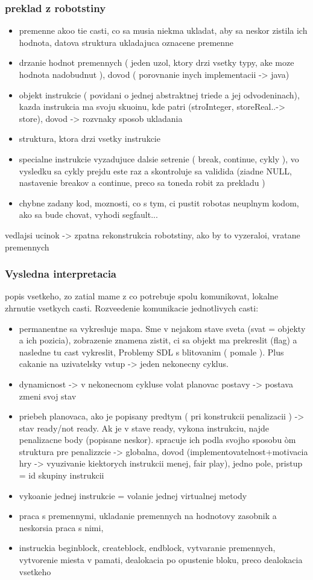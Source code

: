 \documentclass[12pt,notitlepage]{report}
\begin{document}
\subsubsection{preklad z robotstiny}
\begin{itemize}
\item premenne akoo tie casti, co sa musia niekma ukladat, aby sa neskor zistila ich hodnota, datova struktura ukladajuca oznacene premenne
\item drzanie hodnot premennych ( jeden uzol, ktory drzi vsetky typy, ake moze hodnota nadobudnut ), dovod ( porovnanie inych implementacii -> java)
\item objekt instrukcie ( povidani o jednej abstraktnej triede a jej odvodeninach), kazda instrukcia ma svoju skuoinu, kde patri (stroInteger, storeReal..-> store), dovod -> rozvnaky sposob ukladania
\item struktura, ktora drzi vsetky instrukcie
\item specialne instrukcie vyzadujuce dalsie setrenie ( break, continue, cykly ), vo vysledku sa cykly prejdu este raz a skontroluje sa validida (ziadne NULL, nastavenie breakov a continue, preco sa toneda robit za prekladu )
\item chybne zadany kod, moznosti, co s tym, ci pustit robotas  neuplnym kodom, ako sa bude chovat, vyhodi segfault...
\end{itemize}
vedlajsi ucinok -> zpatna rekonstrukcia robotstiny, ako by to vyzeraloi, vratane premennych
\subsubsection{Vysledna interpretacia}
popis vsetkeho, zo zatial mame z co potrebuje spolu komunikovat, lokalne zhrnutie vsetkych casti. Rozveedenie komunikacie jednotlivych casti:
\begin{itemize}
\item permanentne sa vykresluje mapa. Sme v nejakom stave sveta (svat = objekty a ich pozicia), zobrazenie znamena zistit, ci sa objekt ma prekreslit (flag) a nasledne tu cast vykreslit, Problemy SDL s blitovanim ( pomale ). Plus cakanie na uzivatelsky vstup -> jeden nekonecny cyklus.
\item dynamicnost -> v nekonecnom cykluse volat planovac postavy -> postava zmeni svoj stav
\item priebeh planovaca, ako je popisany predtym ( pri konstrukcii penalizacii ) -> stav ready/not ready. Ak je v stave ready, vykona instrukciu, najde penalizacne body (popisane neskor). spracuje ich podla svojho sposobu
òm struktura pre penalizzcie ->  globalna, dovod (implementovatelnost+motivacia hry -> vyuzivanie kiektorych instrukcii menej, fair play), jedno pole, pristup = id skupiny instrukcii
\item vykoanie jednej instrukcie = volanie jednej virtualnej metody
\item praca s premennymi, ukladanie premennych na hodnotovy zasobnik a neskorsia praca s nimi,
\item instruckia beginblock, createblock, endblock, vytvaranie premennych, vytvorenie miesta v pamati, dealokacia po opustenie bloku, preco dealokacia vsetkeho
\end{itemize}
\end{document}
